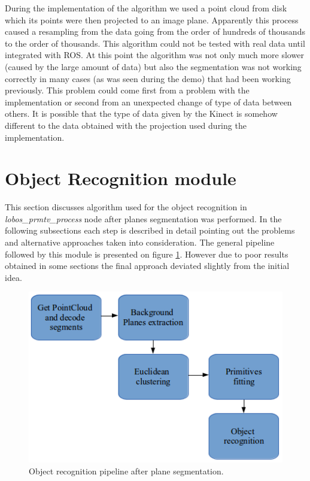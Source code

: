 \documentclass[fontsize=12pt]{article}
\begin{document}
During the implementation of the algorithm we used a point cloud from disk which its points were then projected to an image plane.  Apparently this process caused a resampling from the data going from the order of hundreds of thousands to the order of thousands. This algorithm could not be tested with real data until integrated with ROS. At this point the algorithm was not only much more slower (caused by the large amount of data) but also the segmentation was not working correctly in many cases (as was seen during the demo) that had been working previously. This problem could come first from a problem with the implementation or second from an unexpected change of type of data between others. It is possible that the type of data given by the Kinect is somehow different to the data obtained with the projection used during the implementation. \\



\section{Object Recognition module}
\label{sec:recognition}

This section discusses algorithm used for the object recognition in \emph{lobos\_prmtv\_process} node after planes segmentation was performed. In the following subsections each step is described in detail pointing out the problems and alternative approaches taken into consideration. The general pipeline followed by this module is presented on figure \ref{fig:pipeline}. However due to poor results obtained in some sections the final approach deviated slightly from the initial idea.


\begin{figure}
\begin{center}
  \includegraphics[scale=0.7]{images/pipeline}
  \caption{Object recognition pipeline after plane segmentation.}
  \label{fig:pipeline}
  \end{center}
\end{figure}
\end{document}
